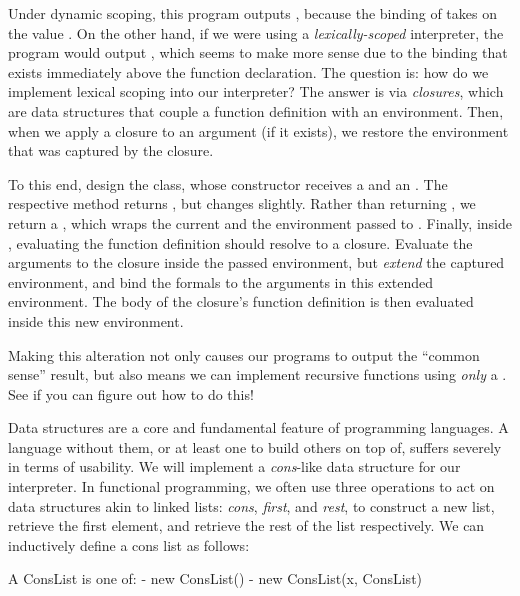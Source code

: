 Under dynamic scoping, this program outputs , because the binding of  takes on the value . On the other hand, if we were using a \textit{lexically-scoped} interpreter, the program would output , which seems to make more sense due to the binding that exists immediately above the function declaration. The question is: how do we implement lexical scoping into our interpreter? The answer is via \textit{closures}, which are data structures that couple a function definition with an environment. Then, when we apply a closure to an argument (if it exists), we restore the environment that was captured by the closure. 

To this end, design the  class, whose constructor receives a  and an . The respective  method returns , but  changes slightly. Rather than returning , we return a , which wraps the current  and the environment passed to . Finally, inside , evaluating the function definition should resolve to a closure. Evaluate the arguments to the closure inside the passed environment, but \textit{extend} the captured environment, and bind the formals to the arguments in this extended environment. The body of the closure's function definition is then evaluated inside this new environment. 

Making this alteration not only causes our programs to output the ``common sense'' result, but also means we can implement recursive functions using \textit{only} a . See if you can figure out how to do this!

Data structures are a core and fundamental feature of programming languages. A language without them, or at least one to build others on top of, suffers severely in terms of usability. We will implement a \emph{cons}-like data structure for our interpreter. In functional programming, we often use three operations to act on data structures akin to linked lists: \emph{cons}, \emph{first}, and \emph{rest}, to construct a new list, retrieve the first element, and retrieve the rest of the list respectively. We can inductively define a cons list as follows:

\begin{verbnobox}[\small]
A ConsList is one of:
 - new ConsList()
 - new ConsList(x, ConsList)
\end{verbnobox}

